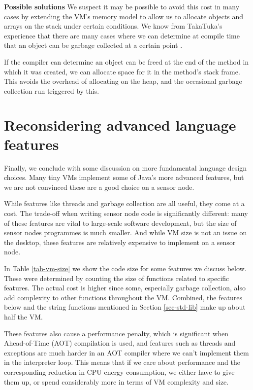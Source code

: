 \textbf{Possible solutions}
We suspect it may be possible to avoid this cost in many cases by extending the VM's memory model to allow us to allocate objects and arrays on the stack under certain conditions. We know from TakaTuka's experience that there are many cases where we can determine at compile time that an object can be garbage collected at a certain point \cite{aslam2010optimized}.

If the compiler can determine an object can be freed at the end of the method in which it was created, we can allocate space for it in the method's stack frame. This avoids the overhead of allocating on the heap, and the occasional garbage collection run triggered by this.



\section{Reconsidering advanced language features}
\label{sec-advanced-features}
Finally, we conclude with some discussion on more fundamental language design choices. Many tiny VMs implement some of Java's more advanced features, but we are not convinced these are a good choice on a sensor node.

While features like threads and garbage collection are all useful, they come at a cost. The trade-off when writing sensor node code is significantly different: many of these features are vital to large-scale software development, but the size of sensor nodes programmes is much smaller. And while VM size is not an issue on the desktop, these features are relatively expensive to implement on a sensor node.

In Table \ref{tab-vm-size} we show the code size for some features we discuss below. These were determined by counting the size of functions related to specific features. The actual cost is higher since some, especially garbage collection, also add complexity to other functions throughout the VM. Combined, the features below and the string functions mentioned in Section \ref{sec-std-lib} make up about half the VM.

These features also cause a performance penalty, which is significant when Ahead-of-Time (AOT) compilation is used, and features such as threads and exceptions are much harder in an AOT compiler where we can't implement them in the interpreter loop. This means that if we care about performance and the corresponding reduction in CPU energy consumption, we either have to give them up, or spend considerably more in terms of VM complexity and size.

